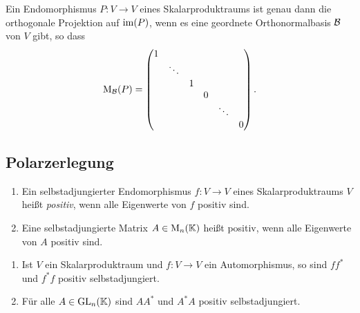 \begin{corollary}
  Ein Endomorphismus $P \colon V \to V$ eines Skalarproduktraums ist genau dann die orthogonale Projektion auf $\operatorname{im}(P)$, wenn es eine geordnete Orthonormalbasis $\mathcal{B}$ von $V$ gibt, so dass
  \[
    \mathrm{M}_{\mathcal{B}}(P)
    =
    \begin{pmatrix}
      1 &         &   &   &         &   \\
        & \ddots  &   &   &         &   \\
        &         & 1 &   &         &   \\
        &         &   & 0 &         &   \\
        &         &   &   & \ddots  &   \\
        &         &   &   &         & 0
    \end{pmatrix}.
  \]
\end{corollary}













\subsection{Polarzerlegung}


\begin{definition}
  \begin{enumerate}[leftmargin=*, label=\roman*)]
    \item
      Ein selbstadjungierter Endomorphismus $f \colon V \to V$ eines Skalarproduktraums $V$ heißt \emph{positiv}, wenn alle Eigenwerte von $f$ positiv sind.
    \item
      Eine selbstadjungierte Matrix $A \in \mathrm{M}_n(\mathbb{K})$ heißt positiv, wenn alle Eigenwerte von $A$ positiv sind.
  \end{enumerate}
\end{definition}


\begin{lemma}
  \begin{enumerate}[leftmargin=*, label=\roman*)]
    \item
      Ist $V$ ein Skalarproduktraum und $f \colon V \to V$ ein Automorphismus, so sind $f f^*$ und $f^* f$ positiv selbstadjungiert.
    \item
      Für alle $A \in \mathrm{GL}_n(\mathbb{K})$ sind $A A^*$ und $A^* A$ positiv selbstadjungiert.
  \end{enumerate}
\end{lemma}


